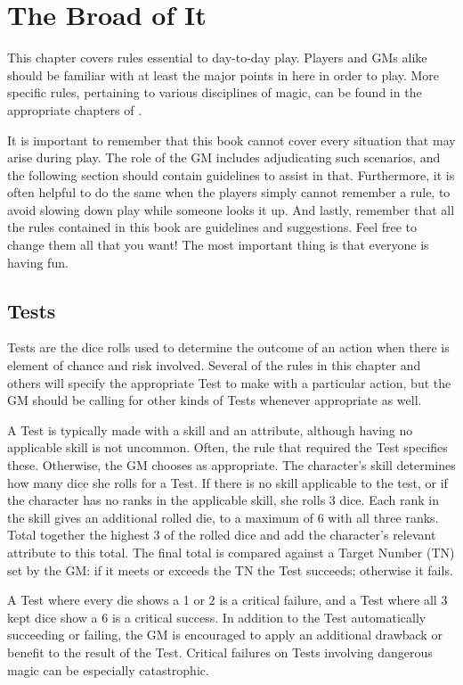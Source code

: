 \chapter{The Broad of It}

This chapter covers rules essential to day-to-day play.
Players and GMs alike should be familiar with at least the major points in here in order to play.
More specific rules, pertaining to various disciplines of magic, can be found in the appropriate chapters of .

It is important to remember that this book cannot cover every situation that may arise during play.
The role of the GM includes adjudicating such scenarios, and the following section should contain guidelines to assist in that.
Furthermore, it is often helpful to do the same when the players simply cannot remember a rule, to avoid slowing down play while someone looks it up.
And lastly, remember that all the rules contained in this book are guidelines and suggestions.
Feel free to change them all that you want!
The most important thing is that everyone is having fun.

\section{Tests}

Tests are the dice rolls used to determine the outcome of an action when there is element of chance and risk involved.
Several of the rules in this chapter and others will specify the appropriate Test to make with a particular action, but the GM should be calling for other kinds of Tests whenever appropriate as well.

A Test is typically made with a skill and an attribute, although having no applicable skill is not uncommon.
Often, the rule that required the Test specifies these.
Otherwise, the GM chooses as appropriate.
The character's skill determines how many dice she rolls for a Test.
If there is no skill applicable to the test, or if the character has no ranks in the applicable skill, she rolls 3 dice.
Each rank in the skill gives an additional rolled die, to a maximum of 6 with all three ranks.
Total together the highest 3 of the rolled dice and add the character's relevant attribute to this total.
The final total is compared against a Target Number (TN) set by the GM: if it meets or exceeds the TN the Test succeeds; otherwise it fails.

A Test where every die shows a 1 or 2 is a critical failure, and a Test where all 3 kept dice show a 6 is a critical success.
In addition to the Test automatically succeeding or failing, the GM is encouraged to apply an additional drawback or benefit to the result of the Test.
Critical failures on Tests involving dangerous magic can be especially catastrophic.

